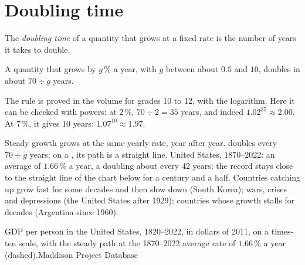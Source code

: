 \section{Doubling time}

\begin{definition}\label{def:g8:growth-and-compounding:doubling-time}
The \emph{doubling time} of a quantity that grows at a fixed rate is the
number of years it takes to double.
\end{definition}

\begin{proposition}[Rule of 70]\label{prop:g8:growth-and-compounding:rule-of-70}
A quantity that grows by $g\,\%$ a year, with $g$ between about $0.5$ and $10$, doubles in about
$70 \div g$ years.
\end{proposition}
\admitted

The rule is proved in the volume for grades 10 to 12, with the logarithm. Here it can be checked
with powers: at $2\,\%$, $70 \div 2 = 35$ years, and indeed $1.02^{35} \approx 2.00$. At $7\,\%$,
it gives 10 years: $1.07^{10} \approx 1.97$.

\begin{model}{Steady growth}
\assumes {} grows at the same yearly rate, year after year.
\predicts {} doubles every $70 \div g$ years; on a , its path is a
straight line.
\tested United States, 1870--2022: an average of $1.66\,\%$ a year, a doubling about every 42
years; the record stays close to the straight line of the chart below for a century and a half.
\breaks Countries catching up grow fast for some decades and then slow down (South Korea);
wars, crises and depressions (the United States after 1929); countries whose growth stalls for
decades (Argentina since 1960).
\end{model}

\begin{omchart}{GDP per person in the United States, 1820--2022, in dollars of 2011, on a
times-ten scale, with the steady path at the 1870--2022 average rate of $1.66\,\%$ a year
(dashed).}{Maddison Project Database}
\end{omchart}

